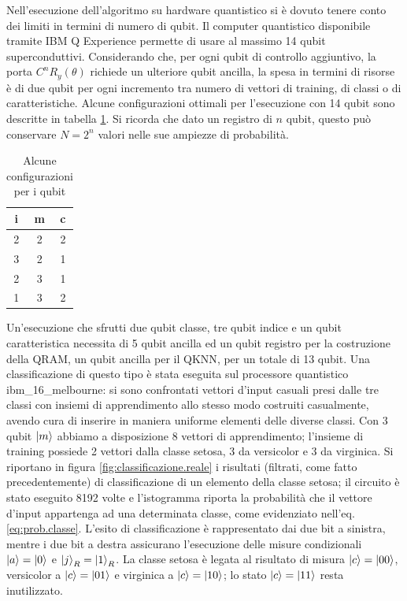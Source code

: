 Nell'esecuzione dell'algoritmo su hardware quantistico si è dovuto tenere 
conto dei limiti in termini di numero di qubit. Il computer quantistico 
disponibile tramite IBM Q Experience permette di usare al massimo 
14 qubit superconduttivi. Considerando che, per ogni qubit di controllo aggiuntivo, 
la porta $C^n R_y (\theta)$ richiede un ulteriore qubit ancilla, la spesa 
in termini di risorse è di due qubit per ogni incremento tra numero di vettori 
di training, di classi o di caratteristiche. Alcune configurazioni ottimali 
per l'esecuzione con 14 qubit sono descritte in tabella \ref{table:conf.ottimali}. 
Si ricorda che dato un registro di $n$ qubit, questo può conservare $N=2^n$ 
valori nelle sue ampiezze di probabilità. 

\begin{table}[h!]
    \centering
    \begin{tabular}{c c c}
        i & m & c \\ 
        \hline
        2 & 2 & 2 \\ 
        3 & 2 & 1 \\ 
        2 & 3 & 1 \\ 
        1 & 3 & 2
    \end{tabular}
    \caption{Alcune configurazioni per i qubit}
    \label{table:conf.ottimali}
\end{table}

Un'esecuzione che sfrutti due qubit classe, tre qubit indice e un qubit caratteristica 
necessita di 5 qubit ancilla ed un qubit registro per la costruzione della \ac{QRAM}, 
un qubit ancilla per il \ac{QKNN}, per un totale di 13 qubit. Una classificazione di 
questo tipo è stata eseguita sul processore quantistico ibm\_16\_melbourne: si sono 
confrontati vettori d'input casuali presi dalle tre classi con insiemi di apprendimento 
allo stesso modo costruiti casualmente, avendo cura di inserire in maniera uniforme 
elementi delle diverse classi. Con 3 qubit $\ket{m}$ abbiamo a disposizione 8 vettori di 
apprendimento; l'insieme di training possiede 2 vettori dalla classe setosa, 3 da versicolor 
e 3 da virginica. Si riportano in figura \ref{fig:classificazione.reale} i 
risultati (filtrati, come fatto precedentemente) di classificazione di un elemento 
della classe setosa; il circuito è stato eseguito 8192 volte e l'istogramma riporta 
la probabilità che il vettore d'input appartenga ad una determinata classe, 
come evidenziato nell'eq. \ref{eq:prob.classe}. L'esito di classificazione è rappresentato 
dai due bit a sinistra, mentre i due bit a destra assicurano l'esecuzione delle misure 
condizionali $\ket{a} = \ket{0}$ e $\ket{j}_R = \ket{1}_R$. 
La classe setosa è legata al risultato di 
misura $\ket{c} = \ket{00}$, versicolor a $\ket{c} = \ket{01}$ e virginica a $\ket{c} = \ket{10}$; 
lo stato $\ket{c} = \ket{11}$ resta inutilizzato. 

